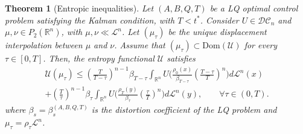 \documentclass[10pt,a4paper]{amsart}
\newtheorem{thm}{Theorem}
\begin{document}
		\begin{thm}[Entropic inequalities]\label{dist_displ_interp}
	 	Let $(A,B,Q,T)$ be a LQ optimal control problem satisfying the Kalman condition, with $T<t^*$.
	 	Consider $U\in\mathcal{DC}_n$ and $\mu,\nu\in P_2(\mathbb{R}^n)$, with $\mu,\nu\ll \mathscr{L}^n$. Let $(\mu_\tau)$ be the unique displacement interpolation between $\mu$ and $\nu$. Assume that $(\mu_\tau)\subset\mathrm{Dom}(\mathcal{U})$ for every $\tau\in[0,T]$. Then, the entropy functional $\mathcal{U}$ satisfies
			\begin{multline}
				\mathcal{U}(\mu_\tau)\leq\left(\frac{T}{T-\tau}\right)^{n-1}\beta_{T-\tau}\int_{\mathbb{R}^n}U\bigg(\frac{\rho_0(x)}{\beta_{T-\tau}}\left(\frac{T-\tau}{T}\right)^n\bigg)d\mathscr{L}^n(x)\\
				+\left(\frac{T}{\tau}\right)^{n-1}\beta_{\tau}\int_{\mathbb{R}^n}U\bigg(\frac{\rho_T(y)}{\beta_{\tau}}\left(\frac{\tau}{T}\right)^n\bigg)d\mathscr{L}^n(y),\qquad\forall \tau\in(0,T).
			\end{multline}
            where $\beta_s=\beta_s^{(A,B,Q,T)}$ is the distortion coefficient of the LQ problem and $\mu_\tau=\rho_\tau\mathscr{L}^n$.
		\end{thm}
\end{document}
